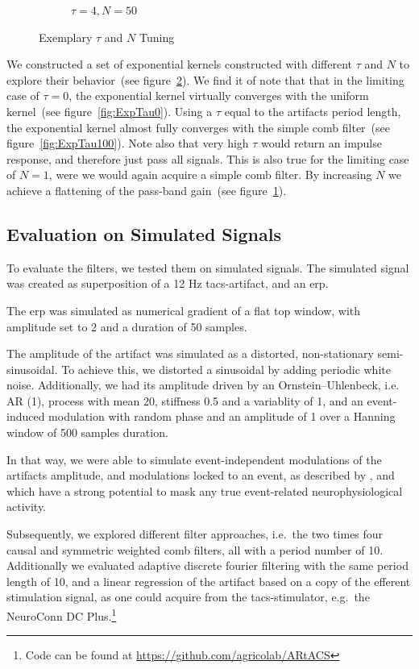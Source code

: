 \documentclass[a4paper]{article}
\newcommand{\figref}[1]{(see figure~\ref{#1})}
\begin{document}
\begin{figure}[hbtp]
\begin{subfigure}{.245\textwidth}
        \caption{$\tau= 4, N=50$}\label{fig:ExpNP50}
    \end{subfigure}
    \caption{Exemplary $\tau$ and $N$ Tuning}\label{fig:ExemplaryTuning}
\end{figure}

We constructed a set of exponential kernels constructed with different $\tau$ and $N$ to explore their behavior~\figref{fig:ExemplaryTuning}.
We find it of note that that in the limiting case of $\tau = 0$, the exponential kernel virtually converges with the uniform kernel~\figref{fig:ExpTau0}. Using a $\tau$ equal to the artifacts period length, the exponential kernel almost fully converges with the simple comb filter~\figref{fig:ExpTau100}.
Note also that very high $\tau$ would return an impulse response, and therefore just pass all signals.
This is also  true for the limiting case of $N = 1$, were we would again acquire a simple comb filter. By increasing $N$ we achieve a flattening of the pass-band gain~\figref{fig:ExpNP50}.



\subsection{Evaluation on Simulated Signals}\label{sec:EvaluationSimulated}

To evaluate the filters, we tested them on simulated signals. The simulated signal was created as superposition of a 12 Hz \gls{tacs}-artifact, and an \gls{erp}.

The \gls{erp} was simulated as numerical gradient of a flat top window, with amplitude set to 2 and a duration of 50 samples.

The amplitude of the artifact was simulated as a distorted, non-stationary semi-sinusoidal.
To achieve this, we distorted a sinusoidal by adding periodic white noise. Additionally, we had its amplitude driven by an Ornstein–Uhlenbeck, i.e. AR (1), process with mean 20, stiffness 0.5 and a variablity of 1, and an event-induced modulation with random phase and an amplitude of 1 over a Hanning window of 500 samples duration.

In that way, we were able to simulate event-independent modulations of the artifacts amplitude, and modulations locked to an event, as described by \citep{Noury_2016}, and which have a strong potential to mask any true event-related neurophysiological activity.


Subsequently, we explored different filter approaches, i.e.\ the two times four causal and symmetric weighted comb filters, all with a period number of 10. Additionally we evaluated adaptive discrete fourier filtering with the same period length of 10, and a linear regression of the artifact based on a copy of the efferent stimulation signal, as one could acquire from the \gls{tacs}-stimulator, e.g.\ the NeuroConn DC Plus.\footnote{Code can be found at \url{https://github.com/agricolab/ARtACS}}
\end{document}
